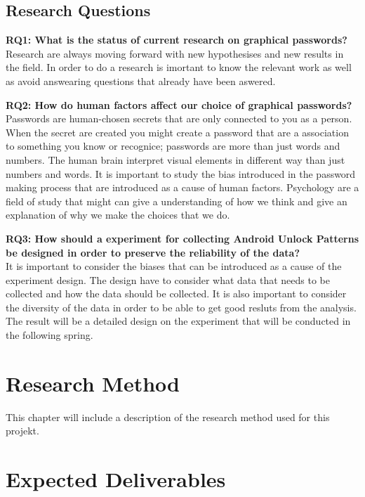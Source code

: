   \subsection*{Research Questions}
  
    {\bf RQ1: What is the status of current research on graphical passwords?} \\
    Research are always moving forward with new hypothesises and new results in the field. In order to do a research is imortant to know the relevant work as well as avoid answearing questions that already have been aswered. 
    
    {\bf RQ2: How do human factors affect our choice of graphical passwords?} \\
    Passwords are human-chosen secrets that are only connected to you as a person. When the secret are created you might create a password that are a association to something you know or recognice; passwords are more than just words and numbers. The human brain interpret visual elements in different way than just numbers and words. It is important to study the bias introduced in the password making process that are introduced as a cause of human factors. Psychology are a field of study that might can give a understanding of how we think and give an explanation of why we make the choices that we do. 
    
    {\bf RQ3: How should a experiment for collecting Android Unlock Patterns be designed in order to preserve the reliability of the data?} \\
    It is important to consider the biases that can be introduced as a cause of the experiment design. The design have to consider what data that needs to be collected and how the data should be collected. It is also important to consider the diversity of the data in order to be able to get good resluts from the analysis. The result will be a detailed design on the experiment that will be conducted in the following spring. 



\section{Research Method}

  This chapter will include a description of the research method used for this projekt.


\section{Expected Deliverables}
  

